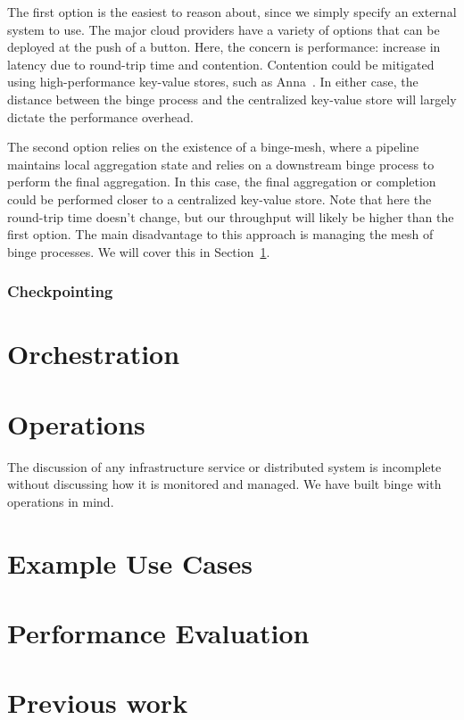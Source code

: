 \documentclass[10pt,twocolumn]{article}
\begin{document}
The first option is the easiest to reason about, since we simply specify an
external system to use.  The major cloud providers have a variety of options
that can be deployed at the push of a button.  Here, the concern is
performance: increase in latency due to round-trip time and contention.
Contention could be mitigated using high-performance key-value stores, such as
Anna~\cite{ANNA}.  In either case, the distance between the binge process and
the centralized key-value store will largely dictate the performance overhead.

The second option relies on the existence of a binge-mesh, where a pipeline
maintains local aggregation state and relies on a downstream binge process to
perform the final aggregation.  In this case, the final aggregation or
completion could be performed closer to a centralized key-value store.  Note
that here the round-trip time doesn't change, but our throughput will likely be
higher than the first option.  The main disadvantage to this approach is
managing the mesh of binge processes.  We will cover this in
Section~\ref{sec:orchestration}.

\subsubsection{Checkpointing}

\section{Orchestration}\label{sec:orchestration}

\section{Operations}\label{sec:operations}

The discussion of any infrastructure service or distributed system is incomplete
without discussing how it is monitored and managed.  We have built binge with
operations in mind.

\section{Example Use Cases}\label{usecases}
\section{Performance Evaluation}\label{evaluation}
\section{Previous work}\label{previous:work}
\end{document}
